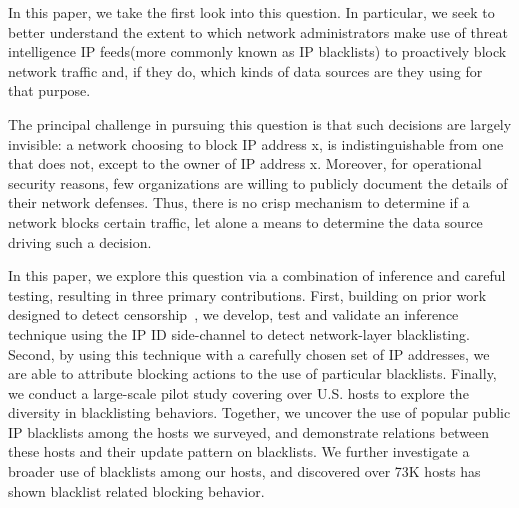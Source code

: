 In this paper, we take the first look into this question. In particular,
we seek to better understand the extent to which network administrators
make use of threat intelligence IP feeds(more commonly known as IP blacklists)
to proactively block network traffic and, if they do, which kinds of data
sources are they using for that purpose.

The principal challenge in pursuing this question is that such
decisions are largely invisible: a network choosing to block IP
address x, is indistinguishable from one that does not, except to the
owner of IP address x.  Moreover, for operational security reasons,
few organizations are willing to publicly document the details of
their network defenses.  Thus, there is no crisp mechanism to
determine if a network blocks certain traffic, let alone a means to
determine the data source driving such a decision.

In this paper, we explore this question via a combination of inference
and careful testing, resulting in three primary contributions.
First, building on prior work designed to detect
censorship~\cite{ensafi2014detecting, pearce2017augur}, we develop,
test and validate an inference technique using the IP ID side-channel to
detect network-layer blacklisting.  Second, by using this technique with a
carefully chosen set of IP addresses, we are able to attribute
blocking actions to the use of particular blacklists.  Finally, we conduct a
large-scale pilot study covering over {} U.S. hosts
to explore the diversity in blacklisting behaviors. Together, we
uncover the use of {\blacklistnum} popular public IP blacklists among
the hosts we surveyed, and demonstrate relations between these hosts
and their update pattern on blacklists. We further investigate a broader
use of blacklists among our hosts, and discovered over 73K hosts has
shown blacklist related blocking behavior.





%
%
%








%

